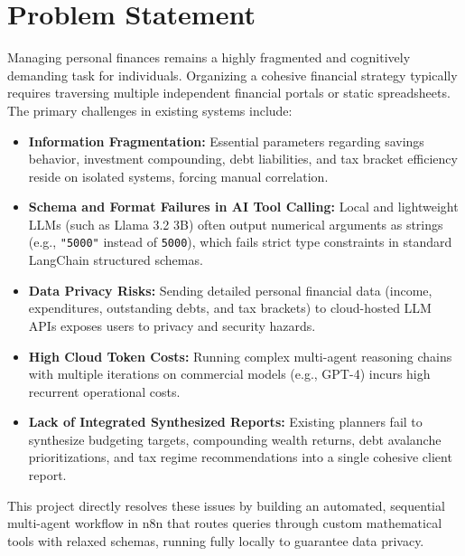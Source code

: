 \documentclass[12pt,a4paper]{report}
\begin{document}
\section{Problem Statement}
Managing personal finances remains a highly fragmented and cognitively demanding task for individuals. Organizing a cohesive financial strategy typically requires traversing multiple independent financial portals or static spreadsheets. The primary challenges in existing systems include:
\begin{itemize}
    \item \textbf{Information Fragmentation:} Essential parameters regarding savings behavior, investment compounding, debt liabilities, and tax bracket efficiency reside on isolated systems, forcing manual correlation.
    \item \textbf{Schema and Format Failures in AI Tool Calling:} Local and lightweight LLMs (such as Llama 3.2 3B) often output numerical arguments as strings (e.g., \texttt{"5000"} instead of \texttt{5000}), which fails strict type constraints in standard LangChain structured schemas.
    \item \textbf{Data Privacy Risks:} Sending detailed personal financial data (income, expenditures, outstanding debts, and tax brackets) to cloud-hosted LLM APIs exposes users to privacy and security hazards.
    \item \textbf{High Cloud Token Costs:} Running complex multi-agent reasoning chains with multiple iterations on commercial models (e.g., GPT-4) incurs high recurrent operational costs.
    \item \textbf{Lack of Integrated Synthesized Reports:} Existing planners fail to synthesize budgeting targets, compounding wealth returns, debt avalanche prioritizations, and tax regime recommendations into a single cohesive client report.
\end{itemize}
This project directly resolves these issues by building an automated, sequential multi-agent workflow in n8n that routes queries through custom mathematical tools with relaxed schemas, running fully locally to guarantee data privacy.
\end{document}
